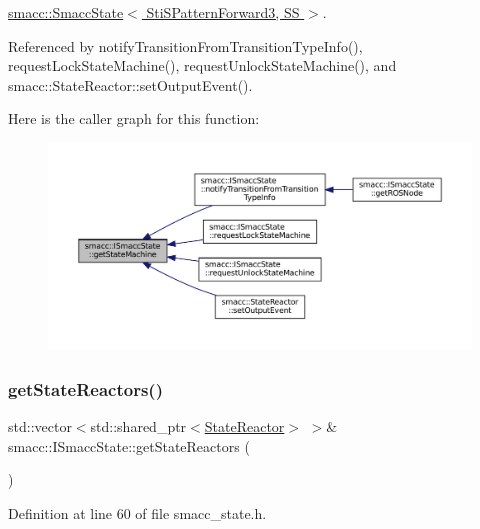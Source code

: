 \hyperlink{classsmacc_1_1SmaccState_afc39f8e0ca4001b2159a100da2fccd0e}{smacc\+::\+Smacc\+State$<$ Sti\+S\+Pattern\+Forward3, S\+S $>$}.



Referenced by notify\+Transition\+From\+Transition\+Type\+Info(), request\+Lock\+State\+Machine(), request\+Unlock\+State\+Machine(), and smacc\+::\+State\+Reactor\+::set\+Output\+Event().

Here is the caller graph for this function\+:
\nopagebreak
\begin{figure}[H]
\begin{center}
\leavevmode
\includegraphics[width=350pt]{classsmacc_1_1ISmaccState_a562bb3f9a3ac16b8be71e4794c9e7523_icgraph}
\end{center}
\end{figure}
\mbox{\label{classsmacc_1_1ISmaccState_acc40f4b3dd02a39242c7e23fe13c3e16}} 
\subsubsection{\texorpdfstring{get\+State\+Reactors()}{getStateReactors()}}
{\footnotesize\ttfamily std\+::vector$<$std\+::shared\+\_\+ptr$<$\hyperlink{classsmacc_1_1StateReactor}{State\+Reactor}$>$ $>$\& smacc\+::\+I\+Smacc\+State\+::get\+State\+Reactors (\begin{DoxyParamCaption}{ }\end{DoxyParamCaption})\hspace{0.3cm}{\ttfamily [inline]}}



Definition at line 60 of file smacc\+\_\+state.\+h.



